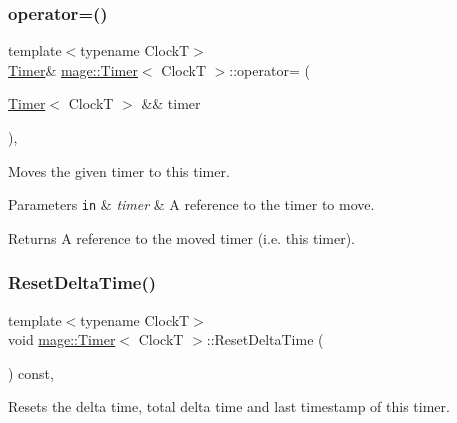 \subsubsection{\texorpdfstring{operator=()}{operator=()}\hspace{0.1cm}{\footnotesize\ttfamily [2/2]}}
{\footnotesize\ttfamily template$<$typename ClockT$>$ \\
\mbox{\hyperlink{classmage_1_1_timer}{Timer}}\& \mbox{\hyperlink{classmage_1_1_timer}{mage\+::\+Timer}}$<$ ClockT $>$\+::operator= (\begin{DoxyParamCaption}\item[{\mbox{\hyperlink{classmage_1_1_timer}{Timer}}$<$ ClockT $>$ \&\&}]{timer }\end{DoxyParamCaption})\hspace{0.3cm}{\ttfamily [default]}, {\ttfamily [noexcept]}}

Moves the given timer to this timer.


\begin{DoxyParams}[1]{Parameters}
\mbox{\tt in}  & {\em timer} & A reference to the timer to move. \\
\hline
\end{DoxyParams}
\begin{DoxyReturn}{Returns}
A reference to the moved timer (i.\+e. this timer). 
\end{DoxyReturn}
\mbox{\label{classmage_1_1_timer_ac39577316a032bce5b009401d67d406b}} 
\subsubsection{\texorpdfstring{Reset\+Delta\+Time()}{ResetDeltaTime()}}
{\footnotesize\ttfamily template$<$typename ClockT$>$ \\
void \mbox{\hyperlink{classmage_1_1_timer}{mage\+::\+Timer}}$<$ ClockT $>$\+::Reset\+Delta\+Time (\begin{DoxyParamCaption}{ }\end{DoxyParamCaption}) const\hspace{0.3cm}{\ttfamily [private]}, {\ttfamily [noexcept]}}

Resets the delta time, total delta time and last timestamp of this timer. \mbox{\label{classmage_1_1_timer_a54dab2d77f8beca30d52e8497e466988}} 
